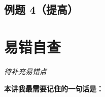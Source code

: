 \documentclass[11pt,a4paper]{ctexart}
\begin{document}



\subsection{例题 4（提高）}




\newpage

\section{易错自查}

\textit{待补充易错点}

\vspace{1em}
\noindent\textbf{本讲我最需要记住的一句话是：}
\vspace{0.5em}

\blank{14cm}
\end{document}
